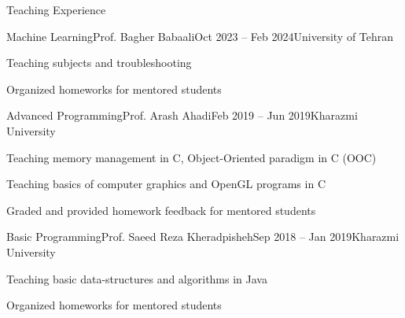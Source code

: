 \documentclass[]{main}
\begin{document}
\begin{section}{Teaching Experience}
    \begin{subsection}{Machine Learning}{Prof. Bagher Babaali}{Oct 2023 -- Feb 2024}{University of Tehran}
        \item Teaching subjects and troubleshooting 
        \item Organized homeworks for mentored students 
        \end{subsection}
\begin{subsection}{Advanced Programming}{Prof. Arash Ahadi}{Feb 2019 -- Jun 2019}{Kharazmi University}
        \item Teaching memory management in C, Object-Oriented paradigm in C (OOC) \;\href{https://github.com/ckoliber/ooc_lecture}{\faExternalLink*}
        \item Teaching basics of computer graphics and OpenGL programs in C \;\href{https://github.com/ckoliber/opengl}{\faExternalLink*}
        \item Graded and provided homework feedback for mentored students 
        \end{subsection}
\begin{subsection}{Basic Programming}{Prof. Saeed Reza Kheradpisheh}{Sep 2018 -- Jan 2019}{Kharazmi University}
        \item Teaching basic data-structures and algorithms in Java 
        \item Organized homeworks for mentored students \;\href{https://github.com/ckoliber/Phy97Sources}{\faExternalLink*}
        \end{subsection}

\end{section}
\end{document}
